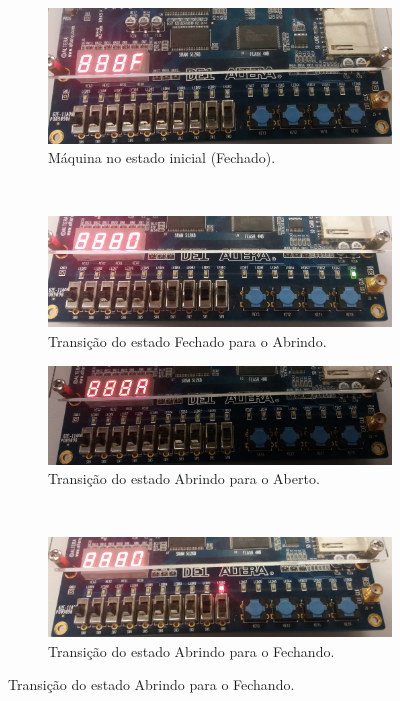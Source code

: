 	\begin{figure}[H]
		\centering

		\begin{subfigure}[b]{0.44\textwidth}
			\includegraphics[width=\textwidth]{img/maquina/placa/Fechado}
			\caption{Máquina no estado inicial (Fechado).}
		\end{subfigure}
		~
		\begin{subfigure}[b]{0.44\textwidth}
			\includegraphics[width=\textwidth]{img/maquina/placa/Fechado-Abrindo}
			\caption{Transição do estado Fechado para o Abrindo.}
		\end{subfigure}

		\begin{subfigure}[b]{0.44\textwidth}
			\includegraphics[width=\textwidth]{img/maquina/placa/Abrindo-Aberto}
			\caption{Transição do estado Abrindo para o Aberto.}
		\end{subfigure}
		~
		\begin{subfigure}[b]{0.44\textwidth}
			\includegraphics[width=\textwidth]{img/maquina/placa/Abrindo-Fechando}
			\caption{Transição do estado Abrindo para o Fechando.}
		\end{subfigure}


\end{figure}
